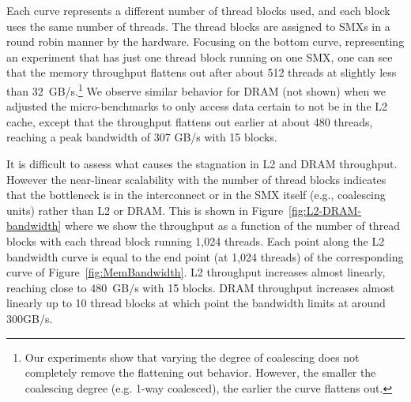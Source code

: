 

Each curve represents a different number of thread blocks used, and each block uses the same number of threads.
The thread blocks are assigned to SMXs in a round robin manner by the hardware.
Focusing on the bottom curve, representing an experiment that has just one thread block running on
one SMX, one can see that the memory throughput flattens out after about 512 threads at slightly less
than 32~GB/s.\footnote{
    Our experiments show that varying the degree of coalescing does not completely
    remove the flattening out behavior. 
    However, the smaller the coalescing degree (e.g. 1-way coalesced), the
    earlier the curve flattens out.}
We observe similar behavior for DRAM (not shown) when we adjusted the micro-benchmarks to only access data certain to not be in the L2 cache, except that the throughput flattens out
earlier at about 480 threads, reaching a peak bandwidth of 307 GB/s with 15 blocks.


It is difficult to assess what causes the stagnation in L2 and DRAM throughput.
However the near-linear scalability with the number of thread blocks indicates that the bottleneck
is in the interconnect or in the SMX itself (e.g., coalescing units) rather than L2 or DRAM.
This is shown in Figure~\ref{fig:L2-DRAM-bandwidth} where we show the throughput as a function of
the number of thread blocks with each thread block running 1,024 threads.
Each point along the L2 bandwidth curve is equal to the end point (at 1,024 threads) of the corresponding curve of
Figure~\ref{fig:MemBandwidth}.
L2 throughput increases almost linearly, reaching close to 480~GB/s with 15 blocks. DRAM throughput increases
almost linearly up to 10 thread blocks at which point the bandwidth limits at around 300GB/s.

